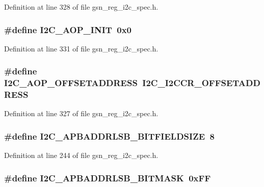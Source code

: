 Definition at line 328 of file gsn\_\-reg\_\-i2c\_\-spec.h.

\hypertarget{a00558_af46babcc5a5168e3a87d0e429e909200}{
\subsubsection[{I2C\_\-AOP\_\-INIT}]{\setlength{\rightskip}{0pt plus 5cm}\#define I2C\_\-AOP\_\-INIT~0x0}}
\label{a00558_af46babcc5a5168e3a87d0e429e909200}


Definition at line 331 of file gsn\_\-reg\_\-i2c\_\-spec.h.

\hypertarget{a00558_ad87d5d020a0afe3c5bbe526adea1c467}{
\subsubsection[{I2C\_\-AOP\_\-OFFSETADDRESS}]{\setlength{\rightskip}{0pt plus 5cm}\#define I2C\_\-AOP\_\-OFFSETADDRESS~I2C\_\-I2CCR\_\-OFFSETADDRESS}}
\label{a00558_ad87d5d020a0afe3c5bbe526adea1c467}


Definition at line 327 of file gsn\_\-reg\_\-i2c\_\-spec.h.

\hypertarget{a00558_a4e392cedc6e73a7439c99ae5bc1fc448}{
\subsubsection[{I2C\_\-APBADDRLSB\_\-BITFIELDSIZE}]{\setlength{\rightskip}{0pt plus 5cm}\#define I2C\_\-APBADDRLSB\_\-BITFIELDSIZE~8}}
\label{a00558_a4e392cedc6e73a7439c99ae5bc1fc448}


Definition at line 244 of file gsn\_\-reg\_\-i2c\_\-spec.h.

\hypertarget{a00558_a88cb2efffaff031e3be69fe5ba08837b}{
\subsubsection[{I2C\_\-APBADDRLSB\_\-BITMASK}]{\setlength{\rightskip}{0pt plus 5cm}\#define I2C\_\-APBADDRLSB\_\-BITMASK~0xFF}}
\label{a00558_a88cb2efffaff031e3be69fe5ba08837b}


